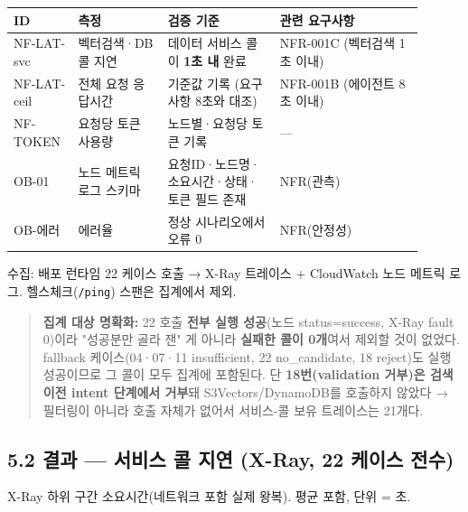 \documentclass[11pt,a4paper]{article}
\newcommand{\DocNeedspace}[1]{\par\ifdim\dimexpr\pagegoal-\pagetotal\relax<#1\newpage\fi}
\begin{document}
\begin{scriptsize}
\begin{longtable}{@{}>{\RaggedRight\arraybackslash}m{0.130\linewidth}>{\RaggedRight\arraybackslash}m{0.200\linewidth}>{\RaggedRight\arraybackslash}m{0.250\linewidth}>{\RaggedRight\arraybackslash}m{0.320\linewidth}@{}}
\toprule\noalign{}
ID & 측정 & 검증 기준 & 관련 요구사항 \\
\midrule\noalign{}
\endhead
\bottomrule\noalign{}
\endlastfoot
NF-LAT-svc & 벡터검색·DB 콜 지연 & 데이터 서비스 콜이 \textbf{1초 내} 완료 & NFR-001C (벡터검색 1초 이내) \\
NF-LAT-ceil & 전체 요청 응답시간 & 기준값 기록 (요구사항 8초와 대조) & NFR-001B (에이전트 8초 이내) \\
NF-TOKEN & 요청당 토큰 사용량 & 노드별·요청당 토큰 기록 & --- \\
OB-01 & 노드 메트릭 로그 스키마 & 요청ID·노드명·소요시간·상태·토큰 필드 존재 & NFR(관측) \\
OB-에러 & 에러율 & 정상 시나리오에서 오류 0 & NFR(안정성) \\
\end{longtable}
\end{scriptsize}

수집: 배포 런타임 22 케이스 호출 → X-Ray 트레이스 + CloudWatch 노드 메트릭 로그. 헬스체크(\texttt{/\allowbreak{}ping}) 스팬은 집계에서 제외.

\begin{quote}
\textbf{집계 대상 명확화:} 22 호출 \textbf{전부 실행 성공}(노드 status=success, X-Ray fault 0)이라 "성공분만 골라 잰" 게 아니라 \textbf{실패한 콜이 0개}여서 제외할 것이 없었다. fallback 케이스(04·07·11 insufficient, 22 no\_candidate, 18 reject)도 실행 성공이므로 그 콜이 모두 집계에 포함된다. 단 \textbf{18번(validation 거부)은 검색 이전 intent 단계에서 거부}돼 S3Vectors/Dynamo\allowbreak{}DB를 호출하지 않았다 → 필터링이 아니라 호출 자체가 없어서 서비스-콜 보유 트레이스는 21개다.
\end{quote}

\DocNeedspace{6\baselineskip}
\subsection*{5.2 결과 --- 서비스 콜 지연 (X-Ray, 22 케이스 전수)}

X-Ray 하위 구간 소요시간(네트워크 포함 실제 왕복). 평균 포함, 단위 = 초.
\end{document}
